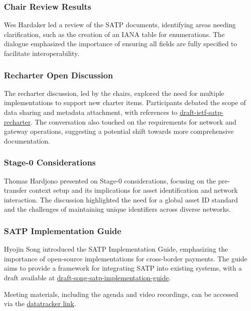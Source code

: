 \documentclass{article}
\begin{document}
\subsubsection{Chair Review Results}
Wes Hardaker led a review of the SATP documents, identifying areas needing clarification, such as the creation of an IANA table for enumerations. The dialogue emphasized the importance of ensuring all fields are fully specified to facilitate interoperability.

\subsubsection{Recharter Open Discussion}
The recharter discussion, led by the chairs, explored the need for multiple implementations to support new charter items. Participants debated the scope of data sharing and metadata attachment, with references to \href{https://datatracker.ietf.org/doc/html/draft-ietf-satp-recharter}{draft-ietf-satp-recharter}. The conversation also touched on the requirements for network and gateway operations, suggesting a potential shift towards more comprehensive documentation.

\subsubsection{Stage-0 Considerations}
Thomas Hardjono presented on Stage-0 considerations, focusing on the pre-transfer context setup and its implications for asset identification and network interaction. The discussion highlighted the need for a global asset ID standard and the challenges of maintaining unique identifiers across diverse networks.

\subsubsection{SATP Implementation Guide}
Hyojin Song introduced the SATP Implementation Guide, emphasizing the importance of open-source implementations for cross-border payments. The guide aims to provide a framework for integrating SATP into existing systems, with a draft available at \href{https://datatracker.ietf.org/doc/html/draft-song-satp-implementation-guide}{draft-song-satp-implementation-guide}.

Meeting materials, including the agenda and video recordings, can be accessed via the \href{https://datatracker.ietf.org/meeting/122/session/satp}{datatracker link}.
\end{document}
